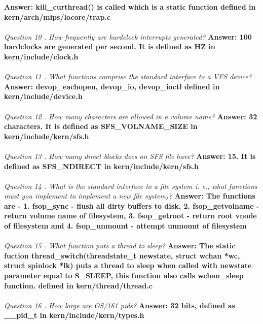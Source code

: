 \documentclass[11pt, english]{article}
\begin{document}
\textbf{Answer: kill\_curthread() is called which is a static function defined in  kern/arch/mips/locore/trap.c}\\ \\
\textit{ Question 10 .  How frequently are hardclock interrupts generated?  }\newline
\textbf{Answer: 100 hardclocks are generated per second. It is defined as HZ in kern/include/clock.h}\\ \\
\textit{ Question 11 .  What functions comprise the standard interface to a VFS device?  }\newline
\textbf{Answer:  devop\_eachopen, devop\_io, devop\_ioctl defined in kern/include/device.h}\\ \\
\textit{ Question 12 .  How many characters are allowed in a volume name?  }\newline
\textbf{Answer: 32 characters. It is defined as SFS\_VOLNAME\_SIZE in kern/include/kern/sfs.h}\\ \\
\textit{ Question 13 .  How many direct blocks does an SFS file have?  }\newline
\textbf{Answer: 15. It is defined as SFS\_NDIRECT in kern/include/kern/sfs.h}\\ \\
\textit{ Question 14 .  What is the standard interface to a file system i. e., what functions must you
implement to implement a new file system)? }\newline
\textbf{Answer: The functions are - 1. fsop\_sync - flush all dirty buffers to disk, 2. fsop\_getvolname - return volume name of filesystem, 3. fsop\_getroot -  return root vnode of filesystem and 4. fsop\_unmount - attempt unmount of filesystem}\\ \\
\textit{ Question 15 .  What function puts a thread to sleep?  }\newline
\textbf{Answer: The static fuction thread\_switch(threadstate\_t newstate, struct wchan *wc, struct spinlock *lk) puts a thread to sleep when called with newstate parameter equal to S\_SLEEP, this function also calls wchan\_sleep function.   defined in kern/thread/thread.c }\\ \\
\textit{ Question 16 .  How large are OS/161 pids?  }\newline
\textbf{Answer: 32 bits, defined as \_\_pid\_t in kern/include/kern/types.h }\\ \\ \\
\end{document}

